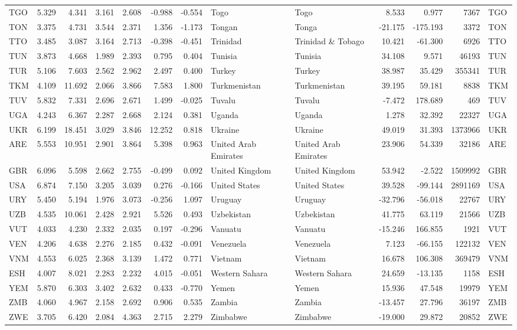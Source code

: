 \begin{tabular}{lrrrrrrllrrrl}
TGO & 5.329 & 4.341 & 3.161 & 2.608 & -0.988 & -0.554 & Togo & Togo & 8.533 & 0.977 & 7367 & TGO \\
TON & 3.375 & 4.731 & 3.544 & 2.371 & 1.356 & -1.173 & Tongan & Tonga & -21.175 & -175.193 & 3372 & TON \\
TTO & 3.485 & 3.087 & 3.164 & 2.713 & -0.398 & -0.451 & Trinidad & Trinidad \& Tobago & 10.421 & -61.300 & 6926 & TTO \\
TUN & 3.873 & 4.668 & 1.989 & 2.393 & 0.795 & 0.404 & Tunisia & Tunisia & 34.108 & 9.571 & 46193 & TUN \\
TUR & 5.106 & 7.603 & 2.562 & 2.962 & 2.497 & 0.400 & Turkey & Turkey & 38.987 & 35.429 & 355341 & TUR \\
TKM & 4.109 & 11.692 & 2.066 & 3.866 & 7.583 & 1.800 & Turkmenistan & Turkmenistan & 39.195 & 59.181 & 8838 & TKM \\
TUV & 5.832 & 7.331 & 2.696 & 2.671 & 1.499 & -0.025 & Tuvalu & Tuvalu & -7.472 & 178.689 & 469 & TUV \\
UGA & 4.243 & 6.367 & 2.287 & 2.668 & 2.124 & 0.381 & Uganda & Uganda & 1.278 & 32.392 & 22327 & UGA \\
UKR & 6.199 & 18.451 & 3.029 & 3.846 & 12.252 & 0.818 & Ukraine & Ukraine & 49.019 & 31.393 & 1373966 & UKR \\
ARE & 5.553 & 10.951 & 2.901 & 3.864 & 5.398 & 0.963 & United Arab Emirates & United Arab Emirates & 23.906 & 54.339 & 32186 & ARE \\
GBR & 6.096 & 5.598 & 2.662 & 2.755 & -0.499 & 0.092 & United Kingdom & United Kingdom & 53.942 & -2.522 & 1509992 & GBR \\
USA & 6.874 & 7.150 & 3.205 & 3.039 & 0.276 & -0.166 & United States & United States & 39.528 & -99.144 & 2891169 & USA \\
URY & 5.450 & 5.194 & 1.976 & 3.073 & -0.256 & 1.097 & Uruguay & Uruguay & -32.796 & -56.018 & 22767 & URY \\
UZB & 4.535 & 10.061 & 2.428 & 2.921 & 5.526 & 0.493 & Uzbekistan & Uzbekistan & 41.775 & 63.119 & 21566 & UZB \\
VUT & 4.033 & 4.230 & 2.332 & 2.035 & 0.197 & -0.296 & Vanuatu & Vanuatu & -15.246 & 166.855 & 1921 & VUT \\
VEN & 4.206 & 4.638 & 2.276 & 2.185 & 0.432 & -0.091 & Venezuela & Venezuela & 7.123 & -66.155 & 122132 & VEN \\
VNM & 4.553 & 6.025 & 2.368 & 3.139 & 1.472 & 0.771 & Vietnam & Vietnam & 16.678 & 106.308 & 369479 & VNM \\
ESH & 4.007 & 8.021 & 2.283 & 2.232 & 4.015 & -0.051 & Western Sahara & Western Sahara & 24.659 & -13.135 & 1158 & ESH \\
YEM & 5.870 & 6.303 & 3.402 & 2.632 & 0.433 & -0.770 & Yemen & Yemen & 15.936 & 47.548 & 19979 & YEM \\
ZMB & 4.060 & 4.967 & 2.158 & 2.692 & 0.906 & 0.535 & Zambia & Zambia & -13.457 & 27.796 & 36197 & ZMB \\
ZWE & 3.705 & 6.420 & 2.084 & 4.363 & 2.715 & 2.279 & Zimbabwe & Zimbabwe & -19.000 & 29.872 & 20852 & ZWE \\
\bottomrule
\end{tabular}
